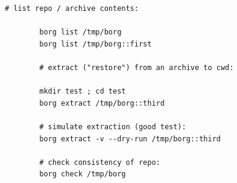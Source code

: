 \documentclass{beamer}
\begin{document}
\begin{frame}[fragile]
	\begin{lstlisting}[backgroundcolor = \color{black},
		basicstyle=\color{lightgray}
		language = bash,
		framexleftmargin = 1em]
		# list repo / archive contents:
		
		borg list /tmp/borg
		borg list /tmp/borg::first
		
		# extract ("restore") from an archive to cwd:
		
		mkdir test ; cd test
		borg extract /tmp/borg::third
		
		# simulate extraction (good test):
		borg extract -v --dry-run /tmp/borg::third
		
		# check consistency of repo:
		borg check /tmp/borg
	\end{lstlisting}
\end{frame}
\end{document}
